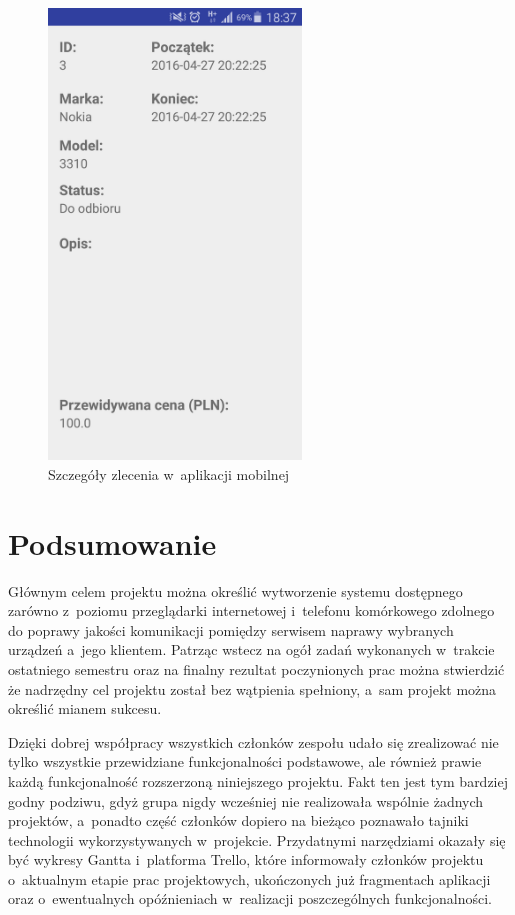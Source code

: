 \documentclass[a4paper,11pt]{article}
\begin{document}
\begin{figure}[H]
	\centering
	\includegraphics[width=0.6\textwidth,height=0.9\textheight]{szczegolyMobile.png}
	\caption{Szczegóły zlecenia w~aplikacji mobilnej}
\end{figure}





\section{Podsumowanie}
Głównym celem projektu można określić wytworzenie systemu dostępnego zarówno z~poziomu przeglądarki internetowej i~telefonu komórkowego zdolnego do poprawy jakości komunikacji pomiędzy serwisem naprawy wybranych urządzeń a~jego klientem. Patrząc wstecz na ogół zadań wykonanych w~trakcie ostatniego semestru oraz na finalny rezultat poczynionych prac można stwierdzić że nadrzędny cel projektu został bez wątpienia spełniony, a~sam projekt można określić mianem sukcesu.

Dzięki dobrej współpracy wszystkich członków zespołu udało się zrealizować nie tylko wszystkie przewidziane funkcjonalności podstawowe, ale również prawie każdą funkcjonalność rozszerzoną niniejszego projektu. Fakt ten jest tym bardziej godny podziwu, gdyż grupa nigdy wcześniej nie realizowała wspólnie żadnych projektów, a~ponadto część członków dopiero na bieżąco poznawało tajniki technologii wykorzystywanych w~projekcie. Przydatnymi narzędziami okazały się być wykresy Gantta i~platforma Trello, które informowały członków projektu o~aktualnym etapie prac projektowych, ukończonych już fragmentach aplikacji oraz o~ewentualnych opóźnieniach w~realizacji poszczególnych funkcjonalności.
\end{document}
